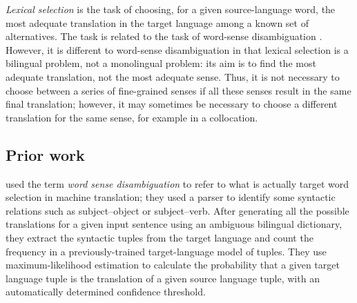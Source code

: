 \documentclass[11pt]{article}
\newcommand{\comment}[1]{\todo{#1}}
\begin{document}
\emph{Lexical selection} is the task of choosing, for a given
source-language word, the most adequate translation in the target
language among a known set of alternatives.  The task is related to
the task of word-sense disambiguation \citep{ide98a}. However, it is
different to word-sense disambiguation in that lexical selection is a
bilingual problem, not a monolingual problem: its aim is to find the
most adequate translation, not the most adequate sense. Thus, it is
not necessary to choose between a series of fine-grained senses if all
these senses result in the same final translation; however, it may
sometimes be necessary to choose a different translation for the same
sense, for example in a collocation.


\subsection{Prior work}
\cite{dagan1994word} used the term \emph{word sense disambiguation} to
refer to what is actually target word selection in machine
translation; they used a parser to identify some syntactic relations
such as subject--object or subject--verb.  After generating all the
possible translations for a given input sentence using an ambiguous
bilingual dictionary, they extract the syntactic tuples from the
target language and count the frequency in a previously-trained
target-language model of tuples.  They use maximum-likelihood
estimation to calculate the probability that a given target language
tuple is the translation of a given source language tuple, with an
automatically determined confidence threshold.
\end{document}
